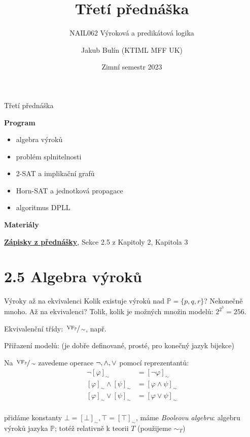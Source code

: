 \documentclass{beamer}
\title{Třetí přednáška}
\subtitle{NAIL062 Výroková a predikátová logika}
\author{Jakub Bulín (KTIML MFF UK)}
\date{Zimní semestr 2023}
\begin{document}
\frame{\titlepage}


\begin{frame}{Třetí přednáška}

    \textbf{Program}
        \begin{itemize}
            \item algebra výroků
            \item problém splnitelnosti
            \item 2-SAT a implikační grafů
            \item Horn-SAT a jednotková propagace
            \item algoritmus DPLL
        \end{itemize}        
    

    \textbf{Materiály}

        \href{https://github.com/jbulin-mff-uk/nail062/raw/main/lecture/lecture-notes/lecture-notes.pdf}{\alert{\textbf{Zápisky z přednášky}}}, Sekce 2.5 z Kapitoly 2, Kapitola 3

\end{frame}


\section{2.5 Algebra výroků}


\begin{frame}{Výroky až na ekvivalenci}
    Kolik existuje výroků nad $\mathbb P=\{p,q,r\}$? Nekonečně mnoho. \alert{Až na ekvivalenci?} Tolik, kolik je možných množin modelů: $2^{2^3}=256$.


    Ekvivalenční třídy: \alert{$\sfrac{\operatorname{VF}_\mathbb P}{\sim}$}, např. 

    Přiřazení modelů: 
    (je dobře definované, prosté, pro konečný jazyk bijekce)

    Na $\sfrac{\operatorname{VF}_\mathbb P}{\sim}$ zavedeme operace $\neg,{\land},{\lor}$ \alert{pomocí reprezentantů}:
    {\small
    \begin{align*}
        \neg [\varphi]_\sim &=[\neg\varphi]_\sim\\
        [\varphi]_\sim \land [\psi]_\sim &= [\varphi\land\psi]_\sim\\
        [\varphi]_\sim \lor [\psi]_\sim &= [\varphi\lor\psi]_\sim\\
    \end{align*}
    }

    \vspace{-18pt}
    přidáme konstanty {\small $\bot=[\bot]_\sim,\top=[\top]_\sim$}, máme \emph{Booleovu algebru}: \alert{algebru výroků} jazyka $\mathbb P$; totéž relativně k teorii $T$ (\alert{použijeme $\sim_T$})
\end{frame}
\end{document}
